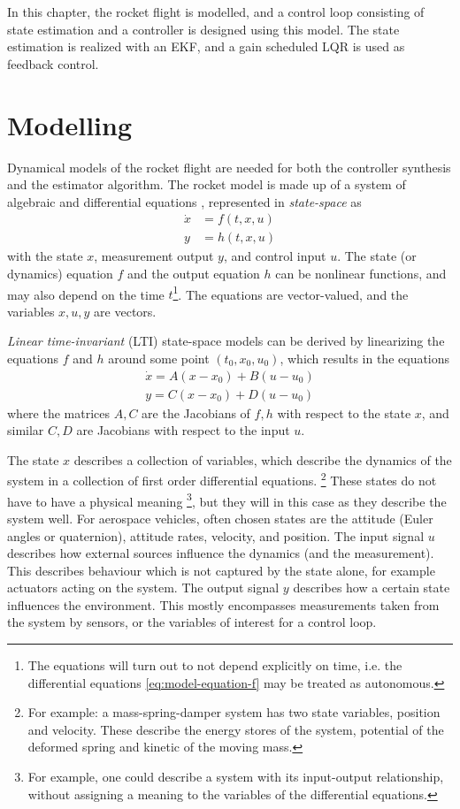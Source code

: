 In this chapter, the rocket flight is modelled, and a control loop consisting of state estimation and a controller is designed using this model.
The state estimation is realized with an EKF, and a gain scheduled LQR is used as feedback control.

\section{Modelling}
Dynamical models of the rocket flight are needed for both the controller synthesis and the estimator algorithm.  
The rocket model is made up of a system of algebraic and differential equations \cite{zipfel2007, lewis2008, stevens2015}, represented in \textit{state-space} as \cite{lewis2008, stevens2015}
\begin{align}
    \dot x &= f(t, x, u) \label{eq:model-equation-f}  \\  
    y &= h(t, x, u) \label{eq:model-equation-h}
\end{align}  
with the state $x$, measurement output $y$, and control input $u$.
The state (or dynamics) equation $f$ and the output equation $h$ can be nonlinear functions, and may also depend on the time $t$\footnote{The equations will turn out to not depend explicitly on time, i.e. the differential equations \ref{eq:model-equation-f} may be treated as autonomous.}.
The equations are vector-valued, and the variables $x,u,y$ are vectors.

\textit{Linear time-invariant} (LTI) state-space models can be derived by linearizing the equations $f$ and $h$ around some point $(t_0, x_0, u_0)$, which results in the equations
\begin{align}
    \dot x = A (x-x_0) + B (u-u_0) \label{eq:model-linear-state} \\
    y = C (x-x_0) + D (u-u_0) \label{eq:model-linear-meas}
\end{align}
where the matrices $A,C$ are the Jacobians of $f,h$ with respect to the state $x$, and similar $C,D$ are Jacobians with respect to the input $u$.

The state $x$ describes a collection of variables, which describe the dynamics of the system in a collection of first order differential equations.
\footnote{For example: a mass-spring-damper system has two state variables, position and velocity. These describe the energy stores of the system, potential of the deformed spring and kinetic of the moving mass.}
These states do not have to have a physical meaning \footnote{For example, one could describe a system with its input-output relationship, without assigning a meaning to the variables of the differential equations.}, but they will in this case as they describe the system well.
For aerospace vehicles, often chosen states are the attitude (Euler angles or quaternion), attitude rates, velocity, and position. 
The input signal $u$ describes how external sources influence the dynamics (and the measurement). 
This describes behaviour which is not captured by the state alone, for example actuators acting on the system.
The output signal $y$ describes how a certain state influences the environment.
This mostly encompasses measurements taken from the system by sensors, or the variables of interest for a control loop. 

